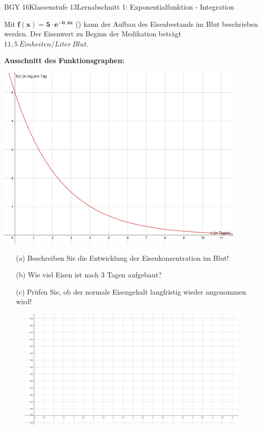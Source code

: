 \documentclass[oneside,openany,headings=optiontotoc,11pt,numbers=noenddot]{scrreprt}
\begin{document}
\begin{worksheet}{BGY 16}{Klassenstufe 13}{Lernabschnitt 1: Exponentialfunktion - Integration}
\begin{framed}
			\par\noindent
			Mit \(\mathbf{f(x) = 5\cdot{}e^{-0,4x}}\) (\tiny{\color{codegray}{x in Tagen nach Beginn der Medikation; \(f(X)\) in mg pro Tag}}\normalcolor\normalsize) kann der Aufbau des Eisenbestands im Blut beschrieben werden. Der Eisenwert zu Beginn der Medikation beträgt \(11,5\ Einheiten/Liter\ Blut\).\\
			\par\noindent
			\begin{minipage}{0.4\textwidth}
				\textbf{Ausschnitt des Funktionsgraphen:}\\
				\par\noindent
				\includegraphics[width=0.9\textwidth,align=t]{../99_bilder/01_ExpFkt/eisen.png}
			\end{minipage}
			\hfill
			\begin{minipage}{0.6\textwidth}
				\begin{itemize}
					\item[(a)] Beschreiben Sie die Entwicklung der Eisenkonzentration im Blut!
					\item[(b)] Wie viel Eisen ist nach 3 Tagen aufgebaut?
					\item[(c)] Prüfen Sie, ob der normale Eisengehalt langfristig wieder angenommen wird!
				\end{itemize}
			\end{minipage}
		\end{framed}
	\end{worksheet}
	\newpage
	\begin{figure}
		\includegraphics[width=1.1\textheight,align=t]{../99_Bilder/01_ExpFkt/patient_koord.png}
	\end{figure}
\end{document}
